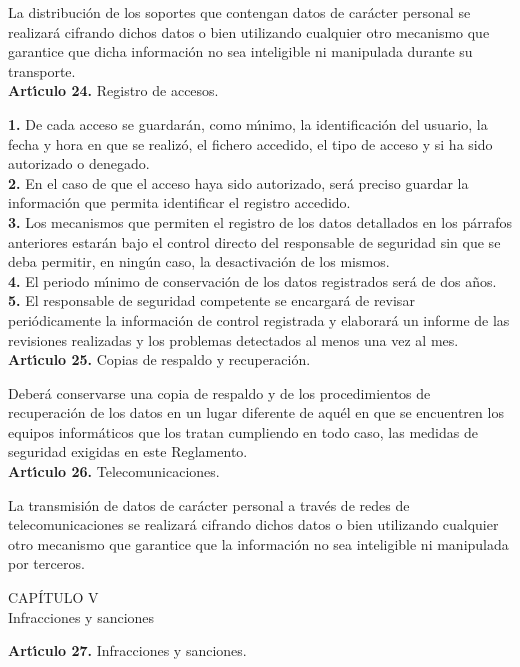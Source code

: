 La distribuci\'on de los soportes que contengan datos de car\'acter personal se 
realizar\'a cifrando dichos datos o bien utilizando cualquier otro mecanismo 
que garantice que dicha informaci\'on no sea inteligible ni manipulada durante 
su transporte.
\vspace{0.3cm}\\
{\large {\bf Art\'{\i}culo 24.} Registro de accesos.}

{\bf 1.} De cada acceso se guardar\'an, como m\'{\i}nimo, la identificaci\'on 
del usuario, la fecha y hora en que se realiz\'o, el fichero accedido, el tipo 
de acceso y si ha sido autorizado o denegado.\\

{\bf 2.} En el caso de que el acceso haya sido autorizado, ser\'a preciso 
guardar la informaci\'on que permita identificar el registro accedido.\\

{\bf 3.} Los mecanismos que permiten el registro de los datos detallados en los 
p\'arrafos anteriores estar\'an bajo el control directo del responsable de 
seguridad sin que se deba permitir, en ning\'un caso, la desactivaci\'on de los 
mismos.\\

{\bf 4.} El periodo m\'{\i}nimo de conservaci\'on de los datos registrados 
ser\'a de dos a\~nos.\\

{\bf 5.} El responsable de seguridad competente se encargar\'a de revisar 
peri\'odicamente la informaci\'on de control registrada y elaborar\'a un 
informe de las revisiones realizadas y los problemas detectados al menos una 
vez al mes.
\vspace{0.3cm}\\
{\large {\bf Art\'{\i}culo 25.} Copias de respaldo y recuperaci\'on.}

Deber\'a conservarse una copia de respaldo y de los procedimientos de 
recuperaci\'on de los datos en un lugar diferente de aqu\'el en que se 
encuentren los equipos inform\'aticos que los tratan cumpliendo en todo caso,
las medidas de seguridad exigidas en este Reglamento.
\vspace{0.3cm}\\
{\large {\bf Art\'{\i}culo 26.} Telecomunicaciones.}

La transmisi\'on de datos de car\'acter personal a trav\'es de redes de 
telecomunicaciones se realizar\'a cifrando dichos datos o bien utilizando 
cualquier otro mecanismo que garantice que la informaci\'on no sea inteligible 
ni manipulada por terceros.
\begin{center}
{\LARGE CAP\'ITULO V}\\ {\large Infracciones y sanciones}
\end{center}
\vspace{0.3cm}
{\large {\bf Art\'{\i}culo 27.} Infracciones y sanciones.}

